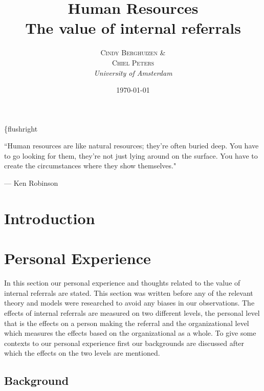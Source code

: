 \documentclass[a4paper, 11pt]{article} %
\title{\textbf{Human Resources}\\ %
The value of internal referrals} %
\author{\textsc{Cindy Berghuizen \& \\ Chiel Peters} %
\\{\textit{University of Amsterdam}}} %
\date{\today} %
\makeatletter
\renewcommand{\maketitle}{ %
\{flushright} %
{\LARGE\@title} %
\makeatother
\begin{document}
\maketitle %



\epigraph{``Human resources are like natural resources; they're often buried deep. You have to go looking for them, they're not just lying around on the surface. You have to create the circumstances where they show themselves."}{--- \textup{Ken Robinson}}

\begin{abstract}
\end{abstract}


\vspace{30pt} %


\section*{Introduction}

\section*{Personal Experience}
In this section our personal experience and thoughts related to the value of internal referrals are stated. This section was written before any of the relevant theory and models were researched to avoid any biases in our observations. The effects of internal referrals are measured on two different levels, the personal level that is the effects on a person making the referral and the organizational level which measures the effects based on the organizational as a whole. To give some contexts to our personal experience first our backgrounds are discussed after which the effects on the two levels are mentioned.

\subsection*{Background}
\end{document}

